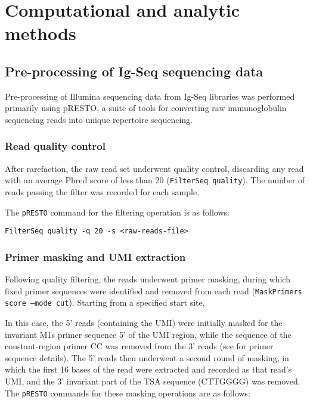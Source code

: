 \section{Computational and analytic methods}

\subsection{Pre-processing of Ig-Seq sequencing data}

Pre-processing of Illumina sequencing data from Ig-Seq libraries was performed primarily using pRESTO, a suite of tools for converting raw immunoglobulin sequencing reads into unique repertoire sequencing.


\subsubsection{Read quality control}

After rarefaction, the raw read set underwent quality control, discarding any read with an average Phred score of less than 20 (\texttt{FilterSeq quality}). The number of reads passing the filter was recorded for each sample.

The \texttt{pRESTO} command for the filtering operation is as follows:

\texttt{FilterSeq quality -q 20 -s <raw-reads-file>}

\subsubsection{Primer masking and UMI extraction}

Following quality filtering, the reads underwent primer masking, during which fixed primer sequences were identified and removed from each read (\texttt{MaskPrimers score --mode cut}). Starting from a specified start site, %

In this case, the 5' reads (containing the UMI) were initially masked for the invariant M1s primer sequence 5' of the UMI region, while the sequence of the constant-region primer CC was removed from the 3' reads (see  for primer sequence details). The 5' reads then underwent a second round of masking, in which the first 16 bases of the read were extracted and recorded as that read's UMI, and the 3' invariant part of the TSA sequence (CTTGGGG) was removed. The \texttt{pRESTO} commands for these masking operations are as follows:

